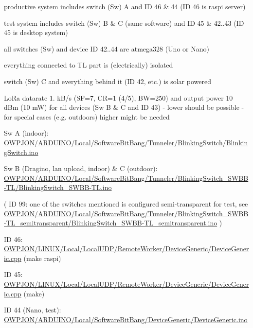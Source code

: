 \begin{DoxyItemize}
\item productive system includes switch (Sw) A and I\-D 46 \& 44 (I\-D 46 is raspi server)
\item test system includes switch (Sw) B \& C (same software) and I\-D 45 \& 42..43 (I\-D 45 is desktop system)
\item all switches (Sw) and device I\-D 42..44 are atmega328 (Uno or Nano)
\item everything connected to T\-L part is (electrically) isolated
\item switch (Sw) C and everything behind it (I\-D 42, etc.) is solar powered
\item Lo\-Ra datarate 1. k\-B/s (S\-F=7, C\-R=1 (4/5), B\-W=250) and output power 10 d\-Bm (10 m\-W) for all devices (Sw B \& C and I\-D 43) -\/ lower should be possible -\/ for special cases (e.\-g. outdoors) higher might be needed
\item Sw A (indoor)\-: \hyperlink{BlinkingSwitch_8ino}{O\-W\-P\-J\-O\-N/\-A\-R\-D\-U\-I\-N\-O/\-Local/\-Software\-Bit\-Bang/\-Tunneler/\-Blinking\-Switch/\-Blinking\-Switch.\-ino}
\item Sw B (Dragino, lan upload, indoor) \& C (outdoor)\-: \hyperlink{BlinkingSwitch__SWBB-TL_8ino}{O\-W\-P\-J\-O\-N/\-A\-R\-D\-U\-I\-N\-O/\-Local/\-Software\-Bit\-Bang/\-Tunneler/\-Blinking\-Switch\-\_\-\-S\-W\-B\-B-\/\-T\-L/\-Blinking\-Switch\-\_\-\-S\-W\-B\-B-\/\-T\-L.\-ino}
\item ( I\-D 99\-: one of the switches mentioned is configured semi-\/transparent for test, see \hyperlink{BlinkingSwitch__SWBB-TL__semitransparent_8ino}{O\-W\-P\-J\-O\-N/\-A\-R\-D\-U\-I\-N\-O/\-Local/\-Software\-Bit\-Bang/\-Tunneler/\-Blinking\-Switch\-\_\-\-S\-W\-B\-B-\/\-T\-L\-\_\-semitransparent/\-Blinking\-Switch\-\_\-\-S\-W\-B\-B-\/\-T\-L\-\_\-semitransparent.\-ino} )
\item I\-D 46\-: \hyperlink{LocalUDP_2RemoteWorker_2DeviceGeneric_2DeviceGeneric_8cpp}{O\-W\-P\-J\-O\-N/\-L\-I\-N\-U\-X/\-Local/\-Local\-U\-D\-P/\-Remote\-Worker/\-Device\-Generic/\-Device\-Generic.\-cpp} (make raspi)
\item I\-D 45\-: \hyperlink{LocalUDP_2RemoteWorker_2DeviceGeneric_2DeviceGeneric_8cpp}{O\-W\-P\-J\-O\-N/\-L\-I\-N\-U\-X/\-Local/\-Local\-U\-D\-P/\-Remote\-Worker/\-Device\-Generic/\-Device\-Generic.\-cpp} (make)
\item I\-D 44 (Nano, test)\-: \hyperlink{ARDUINO_2Local_2SoftwareBitBang_2DeviceGeneric_2DeviceGeneric_8ino}{O\-W\-P\-J\-O\-N/\-A\-R\-D\-U\-I\-N\-O/\-Local/\-Software\-Bit\-Bang/\-Device\-Generic/\-Device\-Generic.\-ino}

\end{DoxyItemize}
